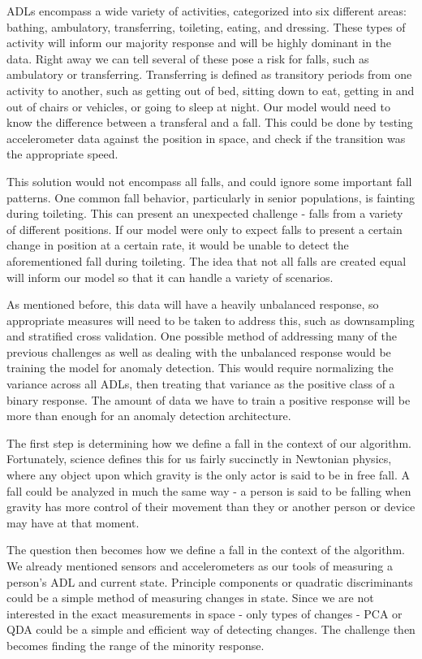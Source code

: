 \documentclass{llncs}
\begin{document}
    ADLs encompass a wide variety of activities, categorized into six different areas: bathing, ambulatory, transferring, toileting, eating, and dressing. These types of activity will inform our majority response and will be highly dominant in the data. Right away we can tell several of these pose a risk for falls, such as ambulatory or transferring. Transferring is defined as transitory periods from one activity to another, such as getting out of bed, sitting down to eat, getting in and out of chairs or vehicles, or going to sleep at night. Our model would need to know the difference between a transferal and a fall. This could be done by testing accelerometer data against the position in space, and check if the transition was the appropriate speed. 
    
    This solution would not encompass all falls, and could ignore some important fall patterns. One common fall behavior, particularly in senior populations, is fainting during toileting. This can present an unexpected challenge - falls from a variety of different positions. If our model were only to expect falls to present a certain change in position at a certain rate, it would be unable to detect the aforementioned fall during toileting. The idea that not all falls are created equal will inform our model so that it can handle a variety of scenarios.
    
    As mentioned before, this data will have a heavily unbalanced response, so appropriate measures will need to be taken to address this, such as downsampling and stratified cross validation. One possible method of addressing many of the previous challenges as well as dealing with the unbalanced response would be training the model for anomaly detection. This would require normalizing the variance across all ADLs, then treating that variance as the positive class of a binary response. The amount of data we have to train a positive response will be more than enough for an anomaly detection architecture.
    
	The first step is determining how we define a fall in the context of our algorithm. Fortunately, science defines this for us fairly succinctly in Newtonian physics, where any object upon which gravity is the only actor is said to be in free fall. A fall could be analyzed in much the same way - a person is said to be falling when gravity has more control of their movement than they or another person or device may have at that moment.
	
	The question then becomes how we define a fall in the context of the algorithm. We already mentioned sensors and accelerometers as our tools of measuring a person's ADL and current state. Principle components or quadratic discriminants could be a simple method of measuring changes in state. Since we are not interested in the exact measurements in space - only types of changes - PCA or QDA could be a simple and efficient way of detecting changes. The challenge then becomes finding the range of the minority response.
	
\end{document}
